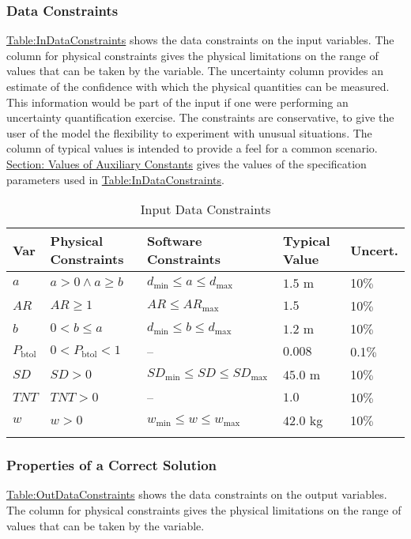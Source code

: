 \documentclass[12pt]{article}
\begin{document}
\subsubsection{Data Constraints}
\label{Sec:DataConstraints}
\hyperref[Table:InDataConstraints]{Table:InDataConstraints} shows the data constraints on the input variables. The column for physical constraints gives the physical limitations on the range of values that can be taken by the variable. The uncertainty column provides an estimate of the confidence with which the physical quantities can be measured. This information would be part of the input if one were performing an uncertainty quantification exercise. The constraints are conservative, to give the user of the model the flexibility to experiment with unusual situations. The column of typical values is intended to provide a feel for a common scenario. \hyperref[Sec:AuxConstants]{Section: Values of Auxiliary Constants} gives the values of the specification parameters used in \hyperref[Table:InDataConstraints]{Table:InDataConstraints}.

\begin{longtable}{l l l l l}
\toprule
\textbf{Var} & \textbf{Physical Constraints} & \textbf{Software Constraints} & \textbf{Typical Value} & \textbf{Uncert.}
\\
\midrule
\endhead
$a$ & $a>0\land{}a\geq{}b$ & ${d_{\text{min}}}\leq{}a\leq{}{d_{\text{max}}}$ & $1.5$ m & 10$\%$
\\
$AR$ & $AR\geq{}1$ & $AR\leq{}{AR_{\text{max}}}$ & $1.5$ & 10$\%$
\\
$b$ & $0<b\leq{}a$ & ${d_{\text{min}}}\leq{}b\leq{}{d_{\text{max}}}$ & $1.2$ m & 10$\%$
\\
${P_{\text{b}\text{tol}}}$ & $0<{P_{\text{b}\text{tol}}}<1$ & -- & $0.008$ & 0.1$\%$
\\
$SD$ & $SD>0$ & ${SD_{\text{min}}}\leq{}SD\leq{}{SD_{\text{max}}}$ & $45.0$ m & 10$\%$
\\
$TNT$ & $TNT>0$ & -- & $1.0$ & 10$\%$
\\
$w$ & $w>0$ & ${w_{\text{min}}}\leq{}w\leq{}{w_{\text{max}}}$ & $42.0$ kg & 10$\%$
\\
\bottomrule
\caption{Input Data Constraints}
\label{Table:InDataConstraints}
\end{longtable}
\subsubsection{Properties of a Correct Solution}
\label{Sec:CorSolProps}
\hyperref[Table:OutDataConstraints]{Table:OutDataConstraints} shows the data constraints on the output variables. The column for physical constraints gives the physical limitations on the range of values that can be taken by the variable.
\end{document}
